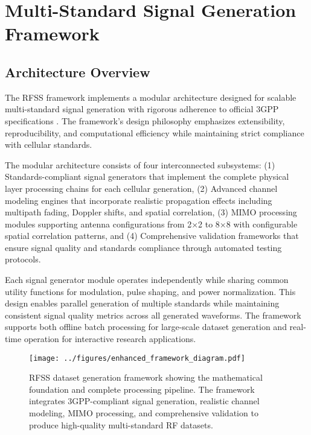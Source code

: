 \documentclass[twocolumn]{article}
\begin{document}
\section{Multi-Standard Signal Generation Framework}

\subsection{Architecture Overview}

The RFSS framework implements a modular architecture designed for scalable multi-standard signal generation with rigorous adherence to official 3GPP specifications \cite{3gpp2018ts45004,3gpp2018ts25211,3gpp2018ts36211,3gpp2020ts38211}. The framework's design philosophy emphasizes extensibility, reproducibility, and computational efficiency while maintaining strict compliance with cellular standards.

The modular architecture consists of four interconnected subsystems: (1) Standards-compliant signal generators that implement the complete physical layer processing chains for each cellular generation, (2) Advanced channel modeling engines that incorporate realistic propagation effects including multipath fading, Doppler shifts, and spatial correlation, (3) MIMO processing modules supporting antenna configurations from 2×2 to 8×8 with configurable spatial correlation patterns, and (4) Comprehensive validation frameworks that ensure signal quality and standards compliance through automated testing protocols.

Each signal generator module operates independently while sharing common utility functions for modulation, pulse shaping, and power normalization. This design enables parallel generation of multiple standards while maintaining consistent signal quality metrics across all generated waveforms. The framework supports both offline batch processing for large-scale dataset generation and real-time operation for interactive research applications. 

\begin{figure*}[t]
\centering
\texttt{[image: ../figures/enhanced\_framework\_diagram.pdf]}
\caption{RFSS dataset generation framework showing the mathematical foundation and complete processing pipeline. The framework integrates 3GPP-compliant signal generation, realistic channel modeling, MIMO processing, and comprehensive validation to produce high-quality multi-standard RF datasets.}
\label{fig:methodology}
\end{figure*}
\end{document}
